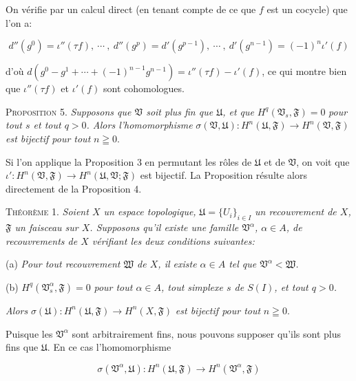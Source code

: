 On vérifie par un calcul direct (en tenant compte de ce que $f$ est un cocycle) que l'on a:

\begin{equation*}
d''(g^0) = \iota''(\tau f), \ \cdots \ , \ d''(g^p) = d'(g^{p-1}), \ \cdots \ , \ d'(g^{n-1}) = (-1)^n \iota'(f)
\end{equation*}

d'où $d(g^0 - g^1 + \cdots + (-1)^{n-1} g^{n-1}) = \iota''(\tau f) - \iota'(f)$, ce qui montre bien que $\iota''(\tau f)$ et $\iota'(f)$ sont cohomologues.

\textsc{Proposition} 5. \textit{Supposons que $\mathfrak{V}$ soit plus fin que $\mathfrak{U}$, et que} $H^q(\mathfrak{V}_s , \mathfrak{F}) = 0$ \textit{pour tout $s$ et tout $q > 0$. Alors l'homomorphisme} $\sigma(\mathfrak{V}, \mathfrak{U}): H^n(\mathfrak{U}, \mathfrak{F}) \rightarrow H^n(\mathfrak{V}, \mathfrak{F})$ \textit{est bijectif pour tout} $n \geqq 0$.

Si l'on applique la Proposition 3 en permutant les rôles de $\mathfrak{U}$ et de $\mathfrak{V}$, on voit que $\iota': H^n(\mathfrak{V}, \mathfrak{F}) \rightarrow H^n(\mathfrak{U}, \mathfrak{V}; \mathfrak{F})$ est bijectif. La Proposition résulte alors directement de la Proposition 4.

\textsc{Théorème} 1. \textit{Soient $X$ un espace topologique,} $\mathfrak{U} = \{U_i\}_{i \in I}$ \textit{un recouvrement de $X$, $\mathfrak{F}$ un faisceau sur $X$. Supposons qu'il existe une famille $\mathfrak{V}^\alpha$, $\alpha \in A$, de recouvrements de $X$ vérifiant les deux conditions suivantes:}

(a) \textit{Pour tout recouvrement $\mathfrak{W}$ de $X$, il existe $\alpha \in A$ tel que $\mathfrak{V}^\alpha < \mathfrak{W}$.}

(b) $H^q(\mathfrak{V}^\alpha_s , \mathfrak{F}) = 0$ \textit{pour tout $\alpha \in A$, tout simplexe $s$ de $S(I)$, et tout $q > 0$.}

\textit{Alors} $\sigma(\mathfrak{U}): H^n(\mathfrak{U}, \mathfrak{F}) \rightarrow H^n(X, \mathfrak{F})$ \textit{est bijectif pour tout} $n \geqq 0$.

Puisque les $\mathfrak{V}^\alpha$ sont arbitrairement fins, nous pouvons supposer qu'ils sont plus fins que $\mathfrak{U}$. En ce cas l'homomorphisme

\begin{equation*}
\sigma(\mathfrak{V}^\alpha, \mathfrak{U}) : H^n(\mathfrak{U}, \mathfrak{F}) \longrightarrow H^n(\mathfrak{V}^\alpha, \mathfrak{F})
\end{equation*}

